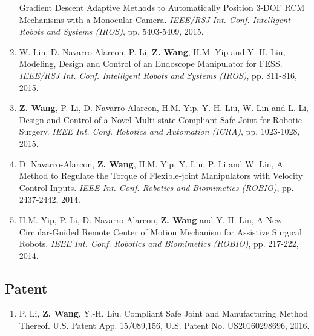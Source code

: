 \documentclass[10pt,letterpaper]{article}
\begin{document}
\begin{enumerate}
    Gradient Descent Adaptive Methods to Automatically Position 3-DOF RCM Mechanisms with a Monocular Camera.
    \textit{{IEEE/RSJ} Int. Conf. Intelligent Robots and Systems (IROS)}, pp. 5403-5409, 2015.
    \item W. Lin, D. Navarro-Alarcon, P. Li, \textbf{Z. Wang}, H.M. Yip and Y.-H. Liu,
    Modeling, Design and Control of an Endoscope Manipulator for FESS.
    \textit{{IEEE/RSJ} Int. Conf. Intelligent Robots and Systems (IROS)}, pp. 811-816, 2015.
    \item \textbf{Z. Wang}, P. Li, D. Navarro-Alarcon, H.M. Yip, Y.-H. Liu, W. Lin and L. Li,
    Design and Control of a Novel Multi-state Compliant Safe Joint for Robotic Surgery.
    \textit{{IEEE} Int. Conf. Robotics and Automation (ICRA)}, pp. 1023-1028, 2015.
    \item D. Navarro-Alarcon, \textbf{Z. Wang}, H.M. Yip, Y. Liu, P. Li and W. Lin,
    A Method to Regulate the Torque of Flexible-joint Manipulators with Velocity Control Inputs.
    \textit{{IEEE} Int. Conf. Robotics and Biomimetics (ROBIO)}, pp. 2437-2442, 2014.
    \item H.M. Yip, P. Li, D. Navarro-Alarcon, \textbf{Z. Wang} and Y.-H. Liu,
    A New Circular-Guided Remote Center of Motion Mechanism for Assistive Surgical Robots.
    \textit{{IEEE} Int. Conf. Robotics and Biomimetics (ROBIO)}, pp. 217-222, 2014.
\end{enumerate}

\subsection*{Patent}
\begin{enumerate}
    \item P. Li, \textbf{Z. Wang}, Y.-H. Liu.
    Compliant Safe Joint and Manufacturing Method Thereof.
    U.S. Patent App. 15/089,156, U.S. Patent No. US20160298696, 2016.
\end{enumerate}


\end{document}
